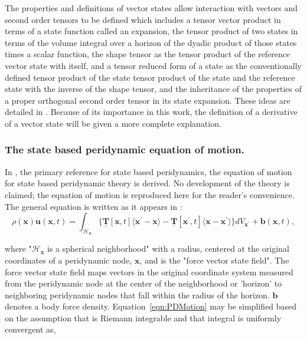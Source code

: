 \documentclass[preprint,12pt]{elsarticle}
\begin{document}
%
The properties and definitions of vector states allow interaction with vectors
and second order tensors to be defined which includes a tensor vector product
in terms of a state function called an expansion, the tensor product of two states in terms of the
volume integral over a horizon of the dyadic product of those states times a
scalar function, the shape tensor as the tensor product of the reference vector
state with itself, and a tensor reduced form of a state as the conventionally
defined tensor product of the state tensor product of the state and the
reference state with the inverse of the shape tensor, and the inheritance of
the properties of a proper orthogonal second order tensor in its state
expansion. These ideas are detailed in \cite{silling:psa}. 
%
Because of its importance in this work, the definition of a derivative of a vector state
will be given a more complete explanation.



\subsubsection{The state based peridynamic equation of motion.}

In \cite{silling:psa}, the primary reference for state based peridynamics, the
equation of motion for state based peridynamic theory is derived. No
development of the theory is claimed; the equation of motion is reproduced here for the reader's convenience.
%
The general equation is written as it appears in \cite{silling:psa}:
\begin{equation} 
    \label{eqn:PDMotion}
    \rho(\boldsymbol{x})\boldsymbol{\ddot{u}}(\boldsymbol{x}, t) = \int_{\mathcal{H}_{\boldsymbol{x}}} \{\boldsymbol{\underline{T}}[\boldsymbol{x}, t]\langle \boldsymbol{x}^{\prime} - \boldsymbol{x} \rangle - \boldsymbol{\underline{T}}[\boldsymbol{x}^{\prime}, t]\langle \boldsymbol{x} - \boldsymbol{x}^{\prime} \rangle \}dV_{\boldsymbol{x}^{\prime}} + \boldsymbol{b}(\boldsymbol{x}, t),
\end{equation} 

where "$\mathcal{H}_{\boldsymbol{x}}$ is a spherical neighborhood" with a
radius, centered at the original coordinates of a peridynamic node,
$\boldsymbol{x}$, and  is the "force vector state
field". The force vector state field maps vectors in the original coordinate system 
measured from the peridynamic node at the center of the neighborhood or 'horizon' to
neighboring peridynamic nodes that fall within the radius of the horizon. $\boldsymbol{b}$ denotes a body force density. Equation~\ref{eqn:PDMotion} may be simplified based on the assumption that
 is Riemann integrable and that integral is uniformly
convergent \cite{silling:psa} as,
\end{document}
